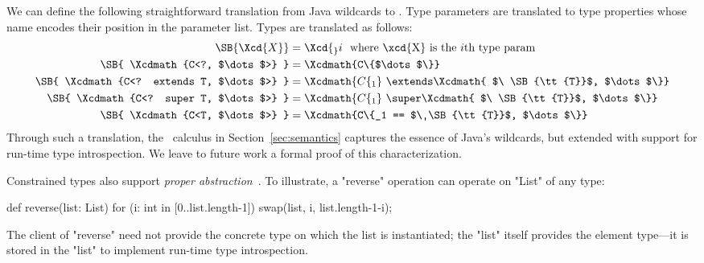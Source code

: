 We can define the following straightforward translation
from Java wildcards to \Xten{}.
Type parameters are translated to type properties whose name
encodes their position in the parameter list.
Types are translated as follows:
\begin{align*}
\SB{ \Xcd{X} } &= \Xcd{_}i ~~\hfill \mbox{where \xcd{X} is the $i$th type param} \\
\SB{ \Xcdmath{C<?, $\dots$>} } &= \Xcdmath{C\{$\dots$\}} \\
\SB{ \Xcdmath{C<? extends T, $\dots$>} } &= \Xcdmath{C\{_1 } \ \extends\Xcdmath{ $\ \SB{\tt{T}}$, $\dots$\}} \\
\SB{ \Xcdmath{C<? super T, $\dots$>} } &= \Xcdmath{C\{_1 } \ \super\Xcdmath{ $\ \SB{\tt{T}}$, $\dots$\}} \\
\SB{ \Xcdmath{C<T, $\dots$>} } &= \Xcdmath{C\{_1 == $\ \SB{\tt{T}}$, $\dots$\}}
\end{align*}
\noindent
Through such a translation, the \FXG\ calculus in
Section~\ref{sec:semantics} captures the essence of Java's
wildcards, but extended with support for run-time type
introspection.  We leave to future work a formal proof of this
characterization.


Constrained types also support
\emph{proper abstraction}~\cite{adding-wildcards}.  To illustrate, a
\xcd"reverse"
operation can operate on \xcd"List" of any type:
{
\begin{xten}
def reverse(list: List) {
  for (i: int in [0..list.length-1])
    swap(list, i, list.length-1-i);
}
\end{xten}}

\noindent
The client of \xcd"reverse" need not provide the concrete type
on which the list is instantiated; the \xcd"list" itself
provides the element type---it is stored in the \xcd"list"
to implement run-time type introspection.

